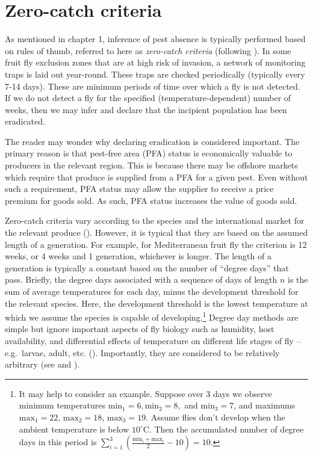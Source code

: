 \documentclass[
  oneside]{book}
\begin{document}
\hypertarget{zero-catch-criteria}{%
\section{Zero-catch criteria}\label{zero-catch-criteria}}

As mentioned in chapter 1, inference of pest absence is typically performed based on rules of thumb, referred to here as \emph{zero-catch criteria} (following \citet{meats2005}). In some fruit fly exclusion zones that are at high risk of invasion, a network of monitoring traps is laid out year-round. These traps are checked periodically (typically every 7-14 days). These are minimum periods of time over which a fly is not detected. If we do not detect a fly for the specified (temperature-dependent) number of weeks, then we may infer and declare that the incipient population has been eradicated.

The reader may wonder why declaring eradication is considered important. The primary reason is that pest-free area (PFA) status is economically valuable to producers in the relevant region. This is because there may be offshore markets which require that produce is supplied from a PFA for a given pest. Even without such a requirement, PFA status may allow the supplier to receive a price premium for goods sold. As such, PFA status increases the value of goods sold.

Zero-catch criteria vary according to the species and the international market for the relevant produce (\citet{meats2005}). However, it is typical that they are based on the assumed length of a generation. For example, for Mediterranean fruit fly the criterion is 12 weeks, or 4 weeks and 1 generation, whichever is longer. The length of a generation is typically a constant based on the number of ``degree days'' that pass. Briefly, the degree days associated with a sequence of days of length \(n\) is the sum of average temperatures for each day, minus the development threshold for the relevant species. Here, the development threshold is the lowest temperature at which we assume the species is capable of developing.\footnote{It may help to consider an example. Suppose over 3 days we observe minimum temperatures \(\mathrm{min}_1 = 6, \mathrm{min}_2 = 8,\) and \(\mathrm{min}_3 = 7\), and maximums \(\mathrm{max}_1 = 22\), \(\mathrm{max}_2 = 18\), \(\mathrm{max}_3 = 19\). Assume flies don't develop when the ambient temperature is below \(10^\circ \mathrm{C}\). Then the accumulated number of degree days in this period is \(\sum_{i=1}^3 \left(\frac{\mathrm{min}_i + \mathrm{max}_i}{2} - 10\right) = 10\).} Degree day methods are simple but ignore important aspects of fly biology such as humidity, host availability, and differential effects of temperature on different life stages of fly -- e.g.~larvae, adult, etc. (\citet{collier2017}). Importantly, they are considered to be relatively arbitrary (see \citet{meats2005} and \citet{collier2017}).
\end{document}
